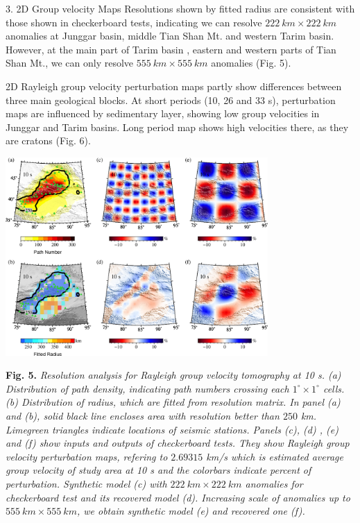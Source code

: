 \documentclass[
    landscape,      %
    paperwidth = 1200mm,
    paperheight = 900mm,
    fontscale = 0.4,
    margin = 1.7cm,
]{baposter}
\begin{document}
\begin{poster}
\begin{posterbox}[column=1]{3. 2D Group velocity Maps}
Resolutions shown by fitted radius are
consistent with those shown in checkerboard tests, indicating we can
resolve $222 \ \textit{km} \times 222 \ \textit{km}$ anomalies at Junggar basin,
middle Tian Shan Mt. and  western Tarim basin. However, at the main part of Tarim basin ,
eastern and western parts of Tian Shan Mt., we can only resolve $555 \ \textit{km} \times 555 \ \textit{km}$
anomalies (Fig. 5).

2D Rayleigh group velocity perturbation maps partly show differences between three main geological
blocks. At short periods (10, 26 and 33 s),  perturbation maps are influenced by sedimentary layer, showing
low group velocities in Junggar and Tarim basins. Long period map shows high velocities there, as they are cratons (Fig. 6).

\begin{center}
\includegraphics[width=0.75\textwidth]{./images/resolution.png}
\begin{minipage}{0.9\textwidth}
\footnotesize
\vspace{0.2em}
\textbf{Fig. 5.}
\itshape
Resolution analysis for Rayleigh group velocity tomography at 10 s. (a) Distribution
of path density, indicating path numbers crossing each $1^{\circ} \times 1^{\circ}$ cells.
(b) Distribution of radius, which are fitted from resolution matrix.  In panel (a) and (b),
solid black line encloses area with resolution better than $250$ km.  Limegreen triangles
indicate locations of seismic stations. Panels (c), (d) , (e) and (f) show inputs and outputs of checkerboard tests.
They show Rayleigh group velocity perturbation maps, refering to $2.69315$ km/s which is estimated average group velocity
of study area at 10 s and the colorbars indicate percent of perturbation.
Synthetic model (c) with $222 \ \textit{km} \times 222 \ \textit{km}$ anomalies for checkerboard test and its recovered model (d).
Increasing scale of anomalies up to $555 \ \textit{km} \times 555 \ \textit{km}$, we obtain synthetic model (e) and
recovered one (f).
\end{minipage}
\end{center}


\end{posterbox}
\end{poster}
\end{document}
